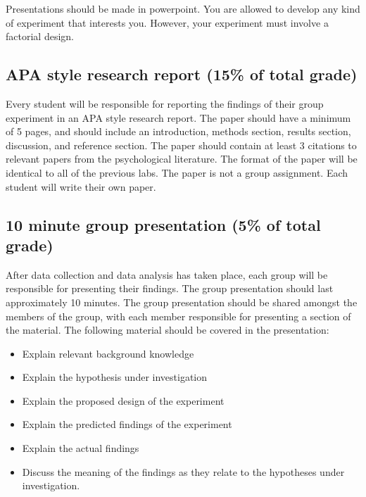 Presentations should be made in powerpoint. You are allowed to develop any kind of experiment that interests you. However, your experiment must involve a factorial design. 

\subsection{APA style research report (15\% of total grade)}

Every student will be responsible for reporting the findings of their group experiment in an APA style research report. The paper should have a minimum of 5 pages, and should include an introduction, methods section, results section, discussion, and reference section. The paper should contain at least 3 citations to relevant papers from the psychological literature. The format of the paper will be identical to all of the previous labs. The paper is not a group assignment. Each student will write their own paper.

\subsection{10 minute group presentation (5\% of total grade)}

After data collection and data analysis has taken place, each group will be responsible for presenting their findings. The group presentation should last approximately 10 minutes. The group presentation should be shared amongst the members of the group, with each member responsible for presenting a section of the material. The following material should be covered in the presentation:

\begin{itemize}
\item Explain relevant background knowledge
\item Explain the hypothesis under investigation
\item Explain the proposed design of the experiment
\item Explain the predicted findings of the experiment
\item Explain the actual findings
\item Discuss the meaning of the findings as they relate to the hypotheses under investigation.
\end{itemize}